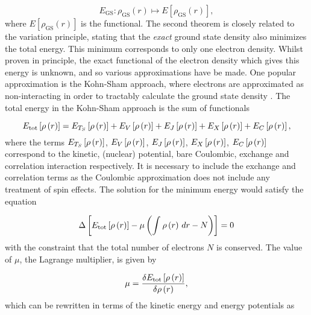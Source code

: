 \begin{equation}
    E_{\text{GS}} : \rho_{\text{GS}} \left(r\right) \mapsto E \left[ \rho_{\text{GS}} \left(r\right)\right],
\end{equation}
%
where $E \left[ \rho_{\text{GS}} \left(r\right)\right]$ is the functional. The second
theorem is closely related to the variation principle, stating that the \emph{exact}
ground state density also minimizes the total energy. This minimum corresponds to 
only one electron density. Whilst proven in principle, the exact functional of the
electron density which gives this energy is unknown, and so various approximations
have be made. One popular approximation is the Kohn-Sham approach, where electrons
are approximated as non-interacting in order to tractably calculate the ground state
density \cite{Kohn1965}. The total energy in the Kohn-Sham approach is the sum of 
functionals

\begin{equation}
    E_{\text{tot}} \left[ \rho\left(r\right) \right] = E_{T_S} \left[ \rho\left(r\right) \right] + E_{V} \left[ \rho\left(r\right) \right] + E_{J} \left[ \rho\left(r\right) \right] + E_{X} \left[ \rho\left(r\right) \right] + E_{C} \left[ \rho\left(r\right) \right],
\end{equation}
%
where the terms $E_{T_S} \left[ \rho\left(r\right) \right]$, $E_{V} \left[ \rho\left(r\right) \right]$,
$E_{J} \left[ \rho\left(r\right) \right]$, $E_{X} \left[ \rho\left(r\right) \right]$, 
$E_{C} \left[ \rho\left(r\right) \right]$ correspond to the kinetic, (nuclear) potential, 
bare Coulombic, exchange and correlation interaction respectively. It is necessary 
to include the exchange and correlation terms as the Coulombic approximation does 
not include any treatment of spin effects. The solution for the minimum energy would
satisfy the equation

\begin{equation}
    \Delta \left[  E_{\text{tot}} \left[ \rho\left(r\right) \right]  - \mu \left( \int_{}^{} \rho\left(r\right) \,dr - N \right) \right] = 0
\end{equation}
%
with the constraint that the total number of electrons $N$ is conserved. The value
of $\mu$, the Lagrange multiplier, is given by

\begin{equation}
    \mu = \frac{\delta  E_{\text{tot}} \left[ \rho\left(r\right) \right]}{\delta \rho\left(r\right)},
\end{equation}
%
which can be rewritten in terms of the kinetic energy and energy potentials as

